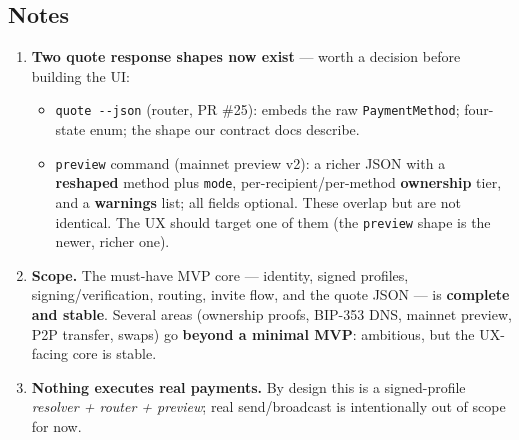 \documentclass[
]{article}
\providecommand{\tightlist}{%
  \setlength{\itemsep}{0pt}\setlength{\parskip}{0pt}}
\begin{document}
\hypertarget{notes}{%
\subsection{Notes}\label{notes}}

\begin{enumerate}
\def\labelenumi{\arabic{enumi}.}
\item
  \textbf{Two quote response shapes now exist} --- worth a decision
  before building the UI:

  \begin{itemize}
  \tightlist
  \item
    \texttt{quote\ -\/-json} (router, PR \#25): embeds the raw
    \texttt{PaymentMethod}; four-state enum; the shape our contract docs
    describe.
  \item
    \texttt{preview} command (mainnet preview v2): a richer JSON with a
    \textbf{reshaped} method plus \texttt{mode},
    per-recipient/per-method \textbf{ownership} tier, and a
    \textbf{warnings} list; all fields optional. These overlap but are
    not identical. The UX should target one of them (the
    \texttt{preview} shape is the newer, richer one).
  \end{itemize}
\item
  \textbf{Scope.} The must-have MVP core --- identity, signed profiles,
  signing/verification, routing, invite flow, and the quote JSON --- is
  \textbf{complete and stable}. Several areas (ownership proofs, BIP-353
  DNS, mainnet preview, P2P transfer, swaps) go \textbf{beyond a minimal
  MVP}: ambitious, but the UX-facing core is stable.
\item
  \textbf{Nothing executes real payments.} By design this is a
  signed-profile \emph{resolver + router + preview}; real send/broadcast
  is intentionally out of scope for now.
\end{enumerate}
\end{document}
